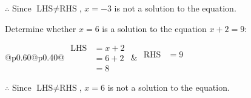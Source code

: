 \documentclass[12pt]{article}
\newcounter{minipagecount}
\begin{document}
\begin{multicols}{2}
\begin{minipage}[t]{0.40\textwidth}
    \noindent \(\therefore\) Since \(\text{LHS} \neq \text{RHS}\), \(x = -3\) is not  a solution to the equation.

\end{minipage}

 \vspace*{16pt}
\noindent{(\theminipagecount)}\hspace{0.1mm} %
\begin{minipage}[t]{0.40\textwidth} %

    \noindent Determine whether \(x = 6\) is a solution to the equation \(x + 2 = 9\):
    \vspace{4pt}  %

    \noindent
    \renewcommand{\arraystretch}{1.3} %
    \begin{tabular}{@{}p{0.60\linewidth}@{}p{0.40\linewidth}@{}}
        \(\begin{aligned}
            \text{LHS} &= x + 2 \\
                    &= 6 + 2 \\
                    &= 8
        \end{aligned}\) &
        \(\begin{aligned}
            \text{RHS} &= 9\\
                    & \\
                    &
        \end{aligned}\)
    \end{tabular}
    \renewcommand{\arraystretch}{1.0} %
    \vspace{2pt}  %

    \noindent \(\therefore\) Since \(\text{LHS} \neq \text{RHS}\), \(x = 6\) is not  a solution to the equation.

\end{minipage}

 \vspace*{16pt}
\noindent{(\theminipagecount)}\hspace{0.1mm} %
\begin{minipage}[t]{0.40\textwidth} %


\end{minipage}
\end{multicols}
\end{document}
